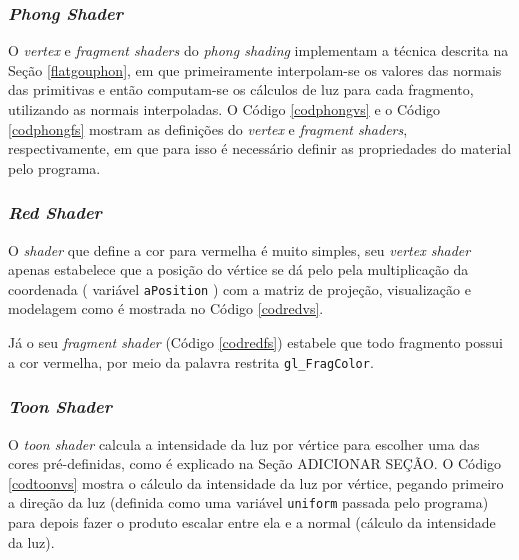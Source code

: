 \subsubsection{\textit{Phong Shader}}

	O \textit{vertex} e \textit{fragment shaders} do \textit{phong shading} implementam a técnica descrita na Seção \ref{flatgouphon}, em que primeiramente interpolam-se os valores das normais das primitivas e então computam-se os cálculos de luz para cada fragmento, utilizando as normais interpoladas. O Código \ref{codphongvs} e o Código \ref{codphongfs} mostram as definições do \textit{vertex} e \textit{fragment shaders}, respectivamente, em que para isso é necessário definir as propriedades do material pelo programa.  

	

	
	
\subsubsection{\textit{Red Shader}}
	
	O \textit{shader} que define a cor para vermelha é muito simples,  seu \textit{vertex shader} apenas estabelece que a posição do vértice  se dá pelo pela multiplicação da coordenada ( variável \texttt{aPosition} ) com a matriz de projeção, visualização e modelagem como é mostrada no Código \ref{codredvs}. 
	
	

	Já o seu \textit{fragment shader} (Código \ref{codredfs}) estabele que todo fragmento possui a cor vermelha, por meio da palavra restrita \texttt{gl\_FragColor}.
	
	

\subsubsection{\textit{Toon Shader}}

	O  \textit{toon shader} calcula a intensidade da luz por vértice para escolher uma das cores pré-definidas, como é explicado na Seção ADICIONAR SEÇÃO. O Código  \ref{codtoonvs} mostra o cálculo da intensidade da luz por vértice, pegando primeiro a direção da luz (definida como uma variável \texttt{uniform} passada pelo programa) para depois fazer o produto escalar entre ela e a normal (cálculo da intensidade da luz).  

